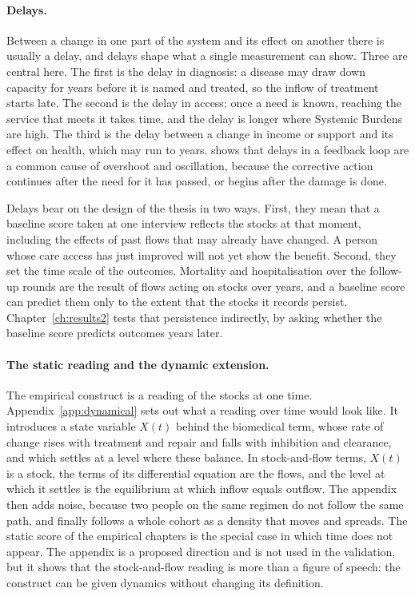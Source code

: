\paragraph{Delays.} Between a change in one part of the system and its effect
on another there is usually a delay, and delays shape what a single
measurement can show. Three are central here. The first is the delay in
diagnosis: a disease may draw down capacity for years before it is named and
treated, so the inflow of treatment starts late. The second is the delay in
access: once a need is known, reaching the service that meets it takes time,
and the delay is longer where Systemic Burdens are high. The third is the
delay between a change in income or support and its effect on health, which
may run to years. \citet{sterman_2000} shows that delays in a feedback loop
are a common cause of overshoot and oscillation, because the corrective action
continues after the need for it has passed, or begins after the damage is
done.

Delays bear on the design of the thesis in two ways. First, they mean that a
baseline score taken at one interview reflects the stocks at that moment,
including the effects of past flows that may already have changed. A person
whose care access has just improved will not yet show the benefit. Second,
they set the time scale of the outcomes. Mortality and hospitalisation over
the follow-up rounds are the result of flows acting on stocks over years, and
a baseline score can predict them only to the extent that the stocks it
records persist. Chapter~\ref{ch:results2} tests that persistence indirectly,
by asking whether the baseline score predicts outcomes years later.

\paragraph{The static reading and the dynamic extension.} The empirical
construct is a reading of the stocks at one time. Appendix~\ref{app:dynamical}
sets out what a reading over time would look like. It
introduces a state variable $X(t)$ behind the biomedical term, whose rate of
change rises with treatment and repair and falls with inhibition and
clearance, and which settles at a level where these balance. In stock-and-flow
terms, $X(t)$ is a stock, the terms of its differential equation are the
flows, and the level at which it settles is the equilibrium at which inflow
equals outflow. The appendix then adds noise, because two people on the same
regimen do not follow the same path, and finally follows a whole cohort as a
density that moves and spreads. The static score of the empirical chapters is
the special case in which time does not appear. The appendix is a proposed
direction and is not used in the validation, but it shows that the
stock-and-flow reading is more than a figure of speech: the construct can be
given dynamics without changing its definition.

